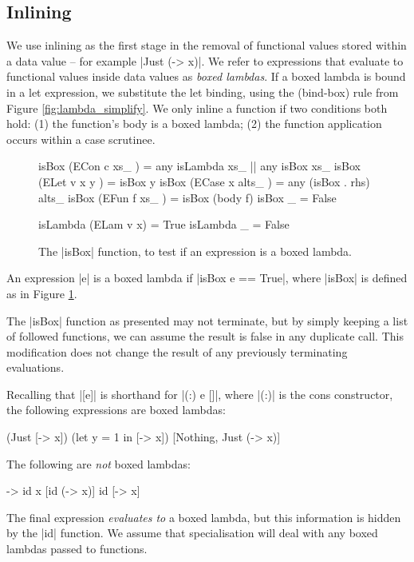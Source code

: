 \subsection{Inlining}
\label{sec:inlining}

We use inlining as the first stage in the removal of functional values stored within a data value -- for example |Just (\x -> x)|. We refer to expressions that evaluate to functional values inside data values as \textit{boxed lambdas}. If a boxed lambda is bound in a let expression, we substitute the let binding, using the (bind-box) rule from Figure \ref{fig:lambda_simplify}. We only inline a function if two conditions both hold: (1) the function's body is a boxed lambda; (2) the function application occurs within a case scrutinee.

\begin{figure}
\begin{code}
isBox (ECon c xs_     )  =  any isLambda xs_ ||  any isBox xs_
isBox (ELet v x y     )  =  isBox y
isBox (ECase x alts_  )  =  any (isBox . rhs) alts_
isBox (EFun f xs_     )  =  isBox (body f)
isBox _                  =  False

isLambda (ELam v x)  = True
isLambda _           = False
\end{code}
\caption{The |isBox| function, to test if an expression is a boxed lambda.}
\label{fig:boxed_lambda}
\end{figure}

\begin{definition}
An expression |e| is a boxed lambda if |isBox e == True|, where |isBox| is defined as in Figure \ref{fig:boxed_lambda}.
\end{definition}

The |isBox| function as presented may not terminate, but by simply keeping a list of followed functions, we can assume the result is false in any duplicate call. This modification does not change the result of any previously terminating evaluations.

\begin{example}
Recalling that |[e]| is shorthand for |(:) e []|, where |(:)| is the cons constructor, the following expressions are boxed lambdas:

\ignore\begin{code}
[\x -> x]
(Just [\x -> x])
(let y = 1 in [\x -> x])
[Nothing, Just (\x -> x)]
\end{code}

\noindent The following are \textit{not} boxed lambdas:

\ignore\begin{code}
\x -> id x
[id (\x -> x)]
id [\x -> x]
\end{code}

The final expression \textit{evaluates to} a boxed lambda, but this information is hidden by the |id| function. We assume that specialisation will deal with any boxed lambdas passed to functions.
\end{example}


